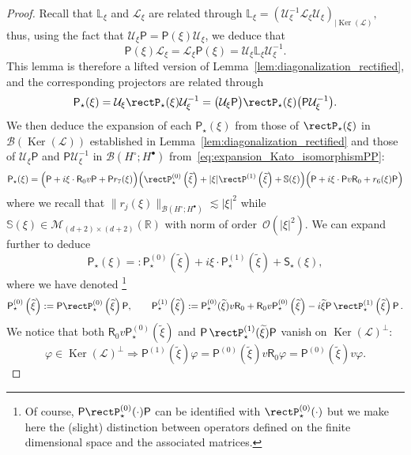 \documentclass[AHL,Unicode,longabstracts,published]{cedram}
\DeclareMathOperator{\nul}{Ker}
\newcommand{\sfR}{\mathsf{R}}
\newcommand{\sfS}{\mathsf{S}}
\newcommand{\R}{\mathbb{R}}
\renewcommand{\S}{\mathbb{S}}
\newcommand{\rectL}{\mathbb{L}}
\newcommand{\OO}{\mathcal{O}}
\newcommand{\LL}{\mathcal{L}}
\newcommand{\PP}{\mathsf{P}}
\newcommand{\UU}{\mathcal{U}}
\newcommand{\BBB}{\mathscr{B}}
\newcommand{\MMM}{\mathscr{M}}
\newcommand{\Ssp}{H^{\bullet}}
\newcommand{\Ssm}{H^{\circ}}
\begin{document}
\begin{proof}
Recall that $\rectL_\xi$ and $\LL_\xi$ are related through $\rectL_\xi = (\UU_\xi^{-1} \LL_{\xi} \UU_\xi)_{| \nul(\LL)},$ thus, using the fact that $\UU_\xi \PP= \PP(\xi) \UU_{\xi}$, we deduce that
\begin{equation*}
\PP(\xi) \LL_{\xi} = \LL_\xi \PP(\xi)= \UU_\xi \rectL_{\xi} \UU_\xi^{-1}.
\end{equation*}
This lemma is therefore a lifted version of Lemma~\ref{lem:diagonalization_rectified}, and the corresponding projectors are related through
\begin{equation*}
\PP_\star(\xi) = \UU_{\xi} \rectP_\star(\xi) \UU_\xi^{-1} = \big(\UU_{\xi} \PP\big) \rectP_\star(\xi) \big(\PP \UU_\xi^{-1}\big).
\end{equation*}
We then deduce the expansion of each $\PP_\star(\xi)$ from those of $\rectP_\star(\xi)$ in $\BBB(\nul(\LL))$ established in Lemma~\ref{lem:diagonalization_rectified} and those of $\UU_\xi \PP$ and $\PP \UU_\xi^{-1}$ in $\BBB(\Ssm ; \Ssp)$ from~\eqref{eq:expansion_Kato_isomorphismPP}:
\[
\PP_\star(\xi) = \Big(\PP + i \xi\cdot \sfR_{0} v \PP + \PP r_{7}(\xi) \Big)
\Big(\rectP_\star^{(0)}\left(\widetilde{\xi} \right) + |\xi| \rectP^{(1)} \left(\widetilde{\xi} \right) + \S(\xi)\Big)\Big(\PP + i \xi \cdot\PP v\sfR_{0} + r_{6}(\xi)\PP \Big)
\]
where we recall that $\|r_{j}(\xi)\|_{\BBB(\Ssm;\Ssp)} \lesssim |\xi|^{2}$ while $\S(\xi) \in \MMM_{(d+2)\times (d+2)}(\R)$ with norm of order~$\OO(|\xi|^2).$ We can expand further to deduce
\[
\PP_\star(\xi) =: \PP_\star^{(0)}\left(\widetilde{\xi}\right) + i \xi \cdot \PP^{(1)}_\star\left(\widetilde{\xi}\right) + \sfS_{\star}(\xi),
\]
where we have denoted \footnote{Of course, $\PP\rectP^{(0)}_{\star}(\cdot)\PP$ can be identified with $\rectP^{(0)}_{\star}(\cdot)$ but we make here the (slight) distinction between operators defined on the finite dimensional space and the associated matrices.}
\begin{gather*}
\PP^{(0)}_\star\left(\widetilde{\xi} \right) := \PP\rectP^{(0)}_\star\left(\widetilde{\xi} \right)\PP,
\qquad
\PP_\star^{(1)}\left(\widetilde{\xi} \right) := \PP^{(0)}_\star(\widetilde{\xi}) v \sfR_{0} +\sfR_{0}v \PP^{(0)}_{\star}\left(\widetilde{\xi}\right)-i\widetilde{\xi}\PP\,\rectP^{(1)}_{\star}\left(\widetilde{\xi}\right)\PP\,.
\end{gather*}
We notice that both $\sfR_{0}v\PP^{(0)}_{\star}(\widetilde{\xi})$ and $\PP\,\rectP^{(1)}_{\star}(\widetilde{\xi})\PP$ vanish on $\nul(\LL)^\perp$:
\[
\varphi \in \nul(\LL)^\perp \Rightarrow \PP^{(1)} \left(\widetilde{\xi} \right) \varphi = \PP^{(0)} \left(\widetilde{\xi} \right) v \sfR_{0} \varphi = \PP^{(0)} \left(\widetilde{\xi} \right) v \varphi.
\]
\end{proof}
\end{document}
